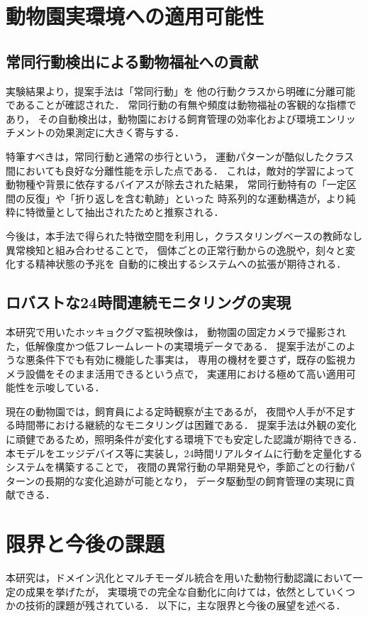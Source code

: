 \section{動物園実環境への適用可能性}

\subsection{常同行動検出による動物福祉への貢献}
実験結果より，提案手法は「常同行動」を
他の行動クラスから明確に分離可能であることが確認された．
常同行動の有無や頻度は動物福祉の客観的な指標であり，
その自動検出は，動物園における飼育管理の効率化および環境エンリッチメントの効果測定に大きく寄与する．

特筆すべきは，常同行動と通常の歩行という，
運動パターンが酷似したクラス間においても良好な分離性能を示した点である．
これは，敵対的学習によって動物種や背景に依存するバイアスが除去された結果，
常同行動特有の「一定区間の反復」や「折り返しを含む軌跡」といった
時系列的な運動構造が，より純粋に特徴量として抽出されたためと推察される．

今後は，本手法で得られた特徴空間を利用し，クラスタリングベースの教師なし異常検知と組み合わせることで，
個体ごとの正常行動からの逸脱や，刻々と変化する精神状態の予兆を
自動的に検出するシステムへの拡張が期待される．

\subsection{ロバストな24時間連続モニタリングの実現}
本研究で用いたホッキョクグマ監視映像は，
動物園の固定カメラで撮影された，低解像度かつ低フレームレートの実環境データである．
提案手法がこのような悪条件下でも有効に機能した事実は，
専用の機材を要さず，既存の監視カメラ設備をそのまま活用できるという点で，
実運用における極めて高い適用可能性を示唆している．

現在の動物園では，飼育員による定時観察が主であるが，
夜間や人手が不足する時間帯における継続的なモニタリングは困難である．
提案手法は外観の変化に頑健であるため，照明条件が変化する環境下でも安定した認識が期待できる．
本モデルをエッジデバイス等に実装し，24時間リアルタイムに行動を定量化するシステムを構築することで，
夜間の異常行動の早期発見や，季節ごとの行動パターンの長期的な変化追跡が可能となり，
データ駆動型の飼育管理の実現に貢献できる．


\section{限界と今後の課題} 本研究は，ドメイン汎化とマルチモーダル統合を用いた動物行動認識において一定の成果を挙げたが， 実環境での完全な自動化に向けては，依然としていくつかの技術的課題が残されている． 以下に，主な限界と今後の展望を述べる．


